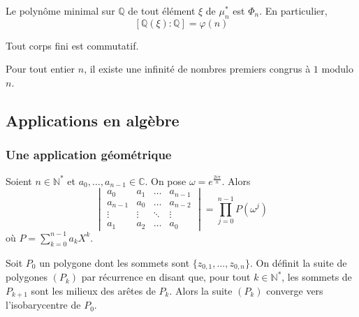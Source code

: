   \begin{corollary}
    Le polynôme minimal sur $\mathbb{Q}$ de tout élément $\xi$ de $\mu_n^*$ est $\Phi_n$. En particulier,
    \[ [\mathbb{Q}(\xi):\mathbb{Q}]=\varphi(n) \]
  \end{corollary}

  \begin{application}
    Tout corps fini est commutatif.
  \end{application}


  \begin{application}
    Pour tout entier $n$, il existe une infinité de nombres premiers congrus à $1$ modulo $n$.
  \end{application}

  \subsection{Applications en algèbre}

  \subsubsection{Une application géométrique}


  \begin{proposition}
    Soient $n \in \mathbb{N}^*$ et $a_0, \dots, a_{n-1} \in \mathbb{C}$. On pose $\omega = e^{\frac{2i\pi}{n}}$. Alors
    \[ \begin{vmatrix} a_0 & a_1 & \dots & a_{n-1} \\ a_{n-1} & a_0 & \dots & a_{n-2}\\ \vdots & \vdots & \ddots & \vdots \\ a_1 & a_2 & \dots & a_0 \end{vmatrix} = \prod_{j=0}^{n-1} P(\omega^j) \]
    où $P = \sum_{k=0}^{n-1} a_k X^k$.
  \end{proposition}


  \begin{application}
    Soit $P_0$ un polygone dont les sommets sont $\{ z_{0,1}, \dots, z_{0,n} \}$. On définit la suite de polygones $(P_k)$ par récurrence en disant que, pour tout $k \in \mathbb{N}^*$, les sommets de $P_{k+1}$ sont les milieux des arêtes de $P_k$.
    \newpar
    Alors la suite $(P_k)$ converge vers l'isobarycentre de $P_0$.
  \end{application}

